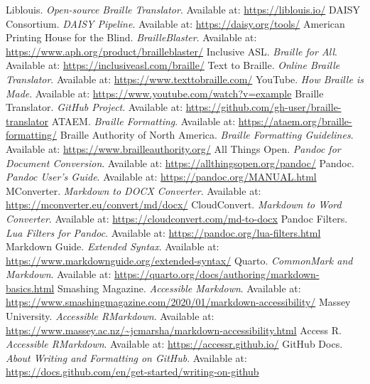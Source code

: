 \begin{thebibliography}{99}
 Liblouis. \textit{Open-source Braille Translator}. Available at: \url{https://liblouis.io/}
 DAISY Consortium. \textit{DAISY Pipeline}. Available at: \url{https://daisy.org/tools/}
 American Printing House for the Blind. \textit{BrailleBlaster}. Available at: \url{https://www.aph.org/product/brailleblaster/}
 Inclusive ASL. \textit{Braille for All}. Available at: \url{https://inclusiveasl.com/braille/}
 Text to Braille. \textit{Online Braille Translator}. Available at: \url{https://www.texttobraille.com/}
 YouTube. \textit{How Braille is Made}. Available at: \url{https://www.youtube.com/watch?v=example}
 Braille Translator. \textit{GitHub Project}. Available at: \url{https://github.com/gh-user/braille-translator}
 ATAEM. \textit{Braille Formatting}. Available at: \url{https://ataem.org/braille-formatting/}
 Braille Authority of North America. \textit{Braille Formatting Guidelines}. Available at: \url{https://www.brailleauthority.org/}
 All Things Open. \textit{Pandoc for Document Conversion}. Available at: \url{https://allthingsopen.org/pandoc/}
 Pandoc. \textit{Pandoc User’s Guide}. Available at: \url{https://pandoc.org/MANUAL.html}
 MConverter. \textit{Markdown to DOCX Converter}. Available at: \url{https://mconverter.eu/convert/md/docx/}
 CloudConvert. \textit{Markdown to Word Converter}. Available at: \url{https://cloudconvert.com/md-to-docx}
 Pandoc Filters. \textit{Lua Filters for Pandoc}. Available at: \url{https://pandoc.org/lua-filters.html}
 Markdown Guide. \textit{Extended Syntax}. Available at: \url{https://www.markdownguide.org/extended-syntax/}
 Quarto. \textit{CommonMark and Markdown}. Available at: \url{https://quarto.org/docs/authoring/markdown-basics.html}
 Smashing Magazine. \textit{Accessible Markdown}. Available at: \url{https://www.smashingmagazine.com/2020/01/markdown-accessibility/}
 Massey University. \textit{Accessible RMarkdown}. Available at: \url{https://www.massey.ac.nz/~jcmarsha/markdown-accessibility.html}
 Access R. \textit{Accessible RMarkdown}. Available at: \url{https://accessr.github.io/}
 GitHub Docs. \textit{About Writing and Formatting on GitHub}. Available at: \url{https://docs.github.com/en/get-started/writing-on-github}

\end{thebibliography}
